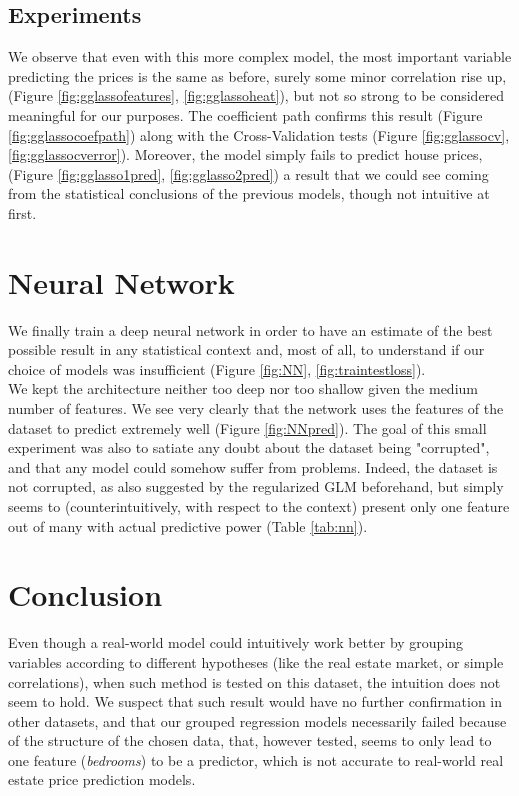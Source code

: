 \documentclass[a4paper, 12pt]{article}
\begin{document}
\begin{multicols}{2}
\subsection{Experiments} \vspace{-3pt}
We observe that even with this more complex model, the most important variable predicting the prices is the same as before, surely some minor correlation rise up, (Figure \ref{fig:gglassofeatures}, \ref{fig:gglassoheat}), but not so strong to be considered meaningful for our purposes. The coefficient path confirms this result (Figure \ref{fig:gglassocoefpath}) along with the Cross-Validation tests (Figure \ref{fig:gglassocv}, \ref{fig:gglassocverror}). Moreover, the model simply fails to predict house prices, (Figure \ref{fig:gglasso1pred}, \ref{fig:gglasso2pred}) a result that we could see coming from the statistical conclusions of the previous models, though not intuitive at first.

\section{Neural Network} \vspace{-7pt}
We finally train a deep neural network in order to have an estimate of the best possible result in any statistical context and, most of all, to understand if our choice of models was insufficient (Figure \ref{fig:NN}, \ref{fig:traintestloss}).\\ We kept the architecture neither too deep nor too shallow given the medium number of features. 
We see very clearly that the network uses the features of the dataset to predict extremely well (Figure \ref{fig:NNpred}). The goal of this small experiment was also to satiate any doubt about the dataset being "corrupted", and that any model could somehow suffer from problems. Indeed, the dataset is not corrupted, as also suggested by the regularized GLM beforehand, but simply seems to (counterintuitively, with respect to the context) present only one feature out of many with actual predictive power (Table \ref{tab:nn}).

\section{Conclusion} \vspace{-7pt}
\noindent
Even though a real-world model could intuitively work better by grouping variables according to different hypotheses (like the real estate market, or simple correlations), when such method is tested on this dataset, the intuition does not seem to hold. We suspect that such result would have no further confirmation in other datasets, and that our grouped regression models necessarily failed because of the structure of the chosen data, that, however tested, seems to only lead to one feature (\textit{bedrooms}) to be a predictor, which is not accurate to real-world real estate price prediction models.
\end{multicols}
\end{document}
